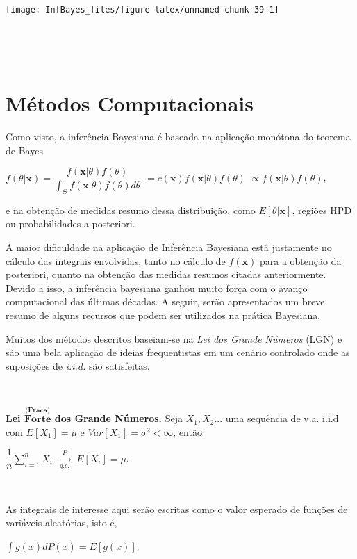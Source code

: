 \documentclass[
]{book}
\begin{document}
\begin{center}\texttt{[image: InfBayes\_files/figure-latex/unnamed-chunk-39-1]} \end{center}

\(~\)

\(~\)

\hypertarget{Comp}{%
\chapter{Métodos Computacionais}\label{Comp}}

Como visto, a inferência Bayesiana é baseada na aplicação monótona do teorema de Bayes

\(f(\theta|\boldsymbol x)=\dfrac{f(\boldsymbol x|\theta)f(\theta)}{\displaystyle\int_\Theta f(\boldsymbol x|\theta)f(\theta)d\theta}\) \(= c(\boldsymbol x) f(\boldsymbol x|\theta)f(\theta)\) \(\propto f(\boldsymbol x|\theta)f(\theta)\),

e na obtenção de medidas resumo dessa distribuição, como \(E[\theta|\boldsymbol x]\), regiões HPD ou probabilidades a posteriori.

A maior dificuldade na aplicação de Inferência Bayesiana está justamente no cálculo das integrais envolvidas, tanto no cálculo de \(f(\boldsymbol x)\) para a obtenção da posteriori, quanto na obtenção das medidas resumos citadas anteriormente. Devido a isso, a inferência bayesiana ganhou muito força com o avanço computacional das últimas décadas. A seguir, serão apresentados um breve resumo de alguns recursos que podem ser utilizados na prática Bayesiana.

Muitos dos métodos descritos baseiam-se na \emph{Lei dos Grande Números} (LGN) e são uma bela aplicação de ideias frequentistas em um cenário controlado onde as suposições de \emph{i.i.d.} são satisfeitas.

\(~\)

\textbf{Lei \(\overset{\textbf{(Fraca)}}{\textbf{Forte}}\) dos Grande Números.} Seja \(X_1,X_2...\) uma sequência de v.a. i.i.d com \(E[X_1]=\mu\) e \(Var[X_1]=\sigma^2<\infty\), então

\(\dfrac{1}{n}\displaystyle \sum_{i=1}^n X_i ~~\underset{q.c.}{\overset{P}{\longrightarrow}}~~ E[X_i]=\mu\).

\(~\)

As integrais de interesse aqui serão escritas como o valor esperado de funções de variáveis aleatórias, isto é,

\(\displaystyle \int g(x) dP(x) = E\left[g(x)\right]\).
\end{document}
